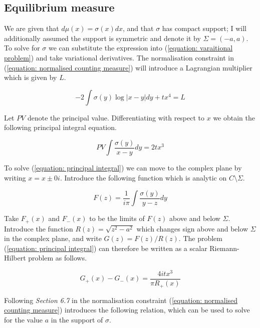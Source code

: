 \documentclass{article}
\begin{document}
\subsection*{Equilibrium measure}

We are given that $d \mu (x) = \sigma (x) dx$, and that $\sigma$ has compact support; I will additionally assumed the support is symmetric and denote it by $\Sigma = (-a, a)$. To solve for $\sigma$ we can substitute the expression into (\ref{equation: varaitional problem}) and take variational derivatives. The normalisation constraint in (\ref{equation: normalised counting measure}) will introduce a Lagrangian multiplier which is given by $L$.  

\begin{equation}
	-2 \int \sigma (y) \log |x - y| dy + t x^4 = L
\end{equation}

Let $PV$ denote the principal value. Differentiating with respect to $x$ we obtain the following principal integral equation. 

\begin{equation}
	PV \int \frac{\sigma(y)}{x-y} dy = 2t x^3 
	\label{equation: principal integral}
\end{equation}

To solve (\ref{equation: principal integral}) we can move to the complex plane by writing $x = x \pm 0i$. Introduce the following function which is analytic on $C \setminus \Sigma$. 

\begin{equation}
	F (z) = \frac{1}{i \pi} \int \frac{\sigma (y)}{y-z} dy
\end{equation}

Take $F_+ (x)$ and $F_-(x)$ to be the limits of $F(z)$ above and below $\Sigma$. Introduce the function $R(z) = \sqrt{z^2 - a^2}$ which changes sign above and below $\Sigma$ in the complex plane, and write $G(z) = F(z) / R(z)$. The problem (\ref{equation: principal integral}) can therefore be written as a scalar Riemann-Hilbert problem as follows. 

\begin{equation}
	G_+ (x) - G_-(x) = \frac{4it x^3}{\pi R_+ (x)}
\end{equation}

Following \textit{Section 6.7} in \cite{deift1999orthogonal} the normalisation constraint (\ref{equation: normalised counting measure})  introduces the following relation, which can be used to solve for the value $a$ in the support of $\sigma$. 
\end{document}
